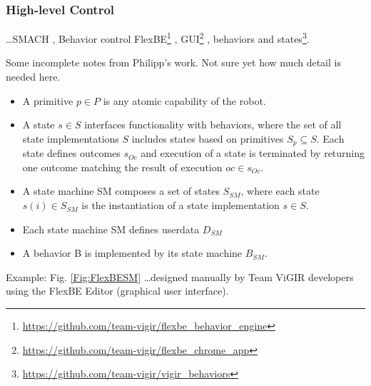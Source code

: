 \subsubsection{High-level Control} 

\ldots SMACH \cite{SMACH2010RAM}, Behavior control \cite{Philipp2013Bsc, Philipp2015Msc} FlexBE\footnote{\scriptsize{\url{https://github.com/team-vigir/flexbe_behavior_engine}}}
, GUI\footnote{\scriptsize{\url{https://github.com/team-vigir/flexbe_chrome_app}}}
, behaviors and states\footnote{\scriptsize{\url{https://github.com/team-vigir/vigir_behaviors}}}.

Some incomplete notes from Philipp's work. Not sure yet how much detail is needed here.
\begin{itemize}
	\item A primitive $p \in P$ is any atomic capability of the robot.
	\item A state $s \in S$ interfaces functionality with behaviors, where the set of all state implementations $S$ includes states based on primitives $S_p \subseteq S$. Each state defines outcomes $s_{Oc}$ and execution of a state is terminated by returning one outcome matching the result of execution $oc \in s_{Oc}$.
	\item A state machine SM composes a set of states $S_{SM}$, where each state $s(i) \in S_{SM}$ is the instantiation of a state implementation $s \in S$.
	\item Each state machine SM defines userdata $D_{SM}$
	\item A behavior B is implemented by its state machine $B_{SM}$.
\end{itemize}

Example: Fig. \ref{Fig:FlexBESM} \ldots designed manually by Team ViGIR developers using the FlexBE Editor (graphical user interface).

